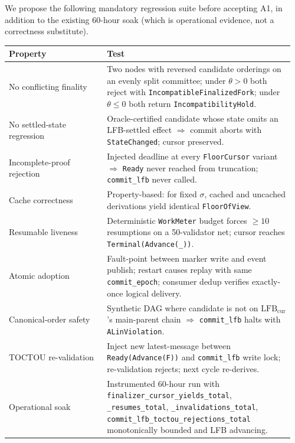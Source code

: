 \documentclass[11pt]{article}
\newcommand{\sigid}{\ensuremath{\sigma}}
\newcommand{\lfbcur}{\ensuremath{\mathrm{LFB}_{\mathrm{cur}}}}
\newcommand{\code}[1]{\texttt{#1}}
\begin{document}
We propose the following mandatory regression suite before accepting
A1, in addition to the existing 60-hour soak (which is operational
evidence, not a correctness substitute).

\begin{center}\small
\begin{tabular}{@{}p{0.33\linewidth}p{0.63\linewidth}@{}}
\toprule
\textbf{Property} & \textbf{Test} \\
\midrule
No conflicting finality &
Two nodes with reversed candidate orderings on an evenly split
committee; under $\theta > 0$ both reject with
\code{IncompatibleFinalizedFork}; under $\theta \le 0$ both return
\code{IncompatibilityHold}. \\

No settled-state regression &
Oracle-certified candidate whose state omits an LFB-settled effect
$\Rightarrow$ commit aborts with \code{StateChanged}; cursor preserved. \\

Incomplete-proof rejection &
Injected deadline at every \code{FloorCursor} variant $\Rightarrow$
\code{Ready} never reached from truncation; \code{commit\_lfb}
never called. \\

Cache correctness &
Property-based: for fixed $\sigid$, cached and uncached derivations
yield identical \code{FloorOfView}. \\

Resumable liveness &
Deterministic \code{WorkMeter} budget forces $\ge 10$ resumptions on
a 50-validator net; cursor reaches \code{Terminal(Advance(\_))}. \\

Atomic adoption &
Fault-point between marker write and event publish; restart causes
replay with same \code{commit\_epoch}; consumer dedup verifies
exactly-once logical delivery. \\

Canonical-order safety &
Synthetic DAG where candidate is not on \code{\lfbcur}'s main-parent
chain $\Rightarrow$ \code{commit\_lfb} halts with
\code{ALinViolation}. \\

TOCTOU re-validation &
Inject new latest-message between \code{Ready(Advance(F))} and
\code{commit\_lfb} write lock; re-validation rejects; next cycle
re-derives. \\

Operational soak &
Instrumented 60-hour run with
\code{finalizer\_cursor\_yields\_total},
\code{\_resumes\_total},
\code{\_invalidations\_total},
\code{commit\_lfb\_toctou\_rejections\_total}
monotonically bounded and LFB advancing. \\
\bottomrule
\end{tabular}
\end{center}
\end{document}
